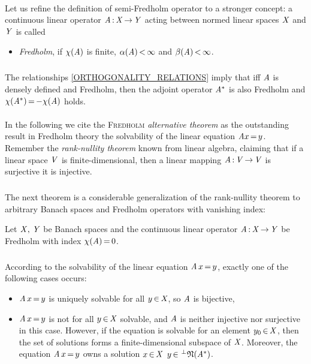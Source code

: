 \documentclass[11pt,twoside]{article}
\begin{document}
\paragraph{} %
Let us refine the definition of semi-Fredholm operator to a stronger concept:
a continuous linear operator $\mathit{A} {\,:\,} \mathit{X} {\,\to\,} \mathit{Y}$
acting between normed linear spaces $\mathit{X}$ and $\mathit{Y}$ is called
\begin{itemize}[leftmargin=12mm]
\item[(F-5)]
\textit{Fredholm},
if $\chi(\mathit{A})$ is finite,
{\ie} $\alpha(\mathit{A}) {\,<\,} \infty$ and $\beta(\mathit{A}) {\,<\,} \infty$.
\end{itemize}

\subparagraph{} %
The relationships \eqref{ORTHOGONALITY_RELATIONS} imply
that iff $\mathit{A}$ is densely defined and Fredholm,
then the adjoint operator $\mathit{A}^*$ is also Fredholm and
$\chi(\mathit{A}^*) {\,=\,} {-} \chi(\mathit{A})$ holds.

\paragraph{} %
In the following we cite the \textsc{Fredholm} \textit{alternative theorem}
as the outstanding result in Fredholm theory
{\wrt} the solvability of the linear equation $\mathit{A} x {\,=\,} y$.
Remember the \textit{rank-nullity theorem} known from linear algebra,
claiming that if a linear space $\mathit{V}$ is finite-dimensional,
then a linear mapping $\mathit{A} {\,:\,} \mathit{V} {\,\to\,} \mathit{V}$ is surjective
\iff it is injective.

\subparagraph{}
The next theorem is a considerable generalization of the rank-nullity theorem
to arbitrary Banach spaces and Fredholm operators with vanishing index:

\begin{theorem1}\label{FREDHOLM_ALTERNATIVE_THEOREM}
Let $\mathit{X},\,\mathit{Y}$ be Banach spaces and
the continuous linear operator $\mathit{A} {\,:\,} \mathit{X} {\,\to\,} \mathit{Y}$ be Fredholm
with index $\chi(\mathit{A}) {\,=\,} 0$.

\subparagraph{}
According to the solvability of the linear equation $\mathit{A} \, x {\,=\,} y$,
exactly one of the following cases occurs:

\begin{itemize}[leftmargin=9mm]
\item[(a)]
$\mathit{A} \, x {\,=\,} y$ is uniquely solvable for all $y {\,\in\,} \mathit{X}$,
so $\mathit{A}$ is bijective,

\item[(b)]
$\mathit{A} \, x {\,=\,} y$ is not for all $y {\,\in\,} \mathit{X}$ solvable,
and $\mathit{A}$ is neither injective nor surjective in this case.
However,
if the equation is solvable for an element $y_0 {\,\in\,} \mathit{X}$,
then the set of solutions forms a finite-dimensional subspace of $\mathit{X}$.
Moreover,
the equation $\mathit{A} \, x {\,=\,} y$ owns a solution $x {\,\in\,} \mathit{X}$
\iff
$y {\,\in\,} \,^{\bot}\mathfrak{N}(\mathit{A}^*)$.
\end{itemize}
\end{theorem1}
\end{document}
